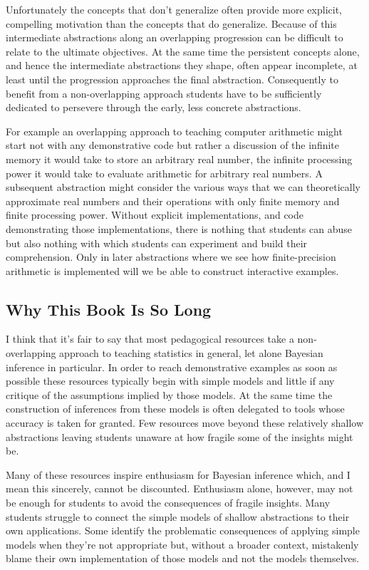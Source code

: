 \documentclass[
  letterpaper,
  DIV=11,
  numbers=noendperiod]{scrartcl}
\begin{document}
Unfortunately the concepts that don't generalize often provide more
explicit, compelling motivation than the concepts that do generalize.
Because of this intermediate abstractions along an overlapping
progression can be difficult to relate to the ultimate objectives. At
the same time the persistent concepts alone, and hence the intermediate
abstractions they shape, often appear incomplete, at least until the
progression approaches the final abstraction. Consequently to benefit
from a non-overlapping approach students have to be sufficiently
dedicated to persevere through the early, less concrete abstractions.

For example an overlapping approach to teaching computer arithmetic
might start not with any demonstrative code but rather a discussion of
the infinite memory it would take to store an arbitrary real number, the
infinite processing power it would take to evaluate arithmetic for
arbitrary real numbers. A subsequent abstraction might consider the
various ways that we can theoretically approximate real numbers and
their operations with only finite memory and finite processing power.
Without explicit implementations, and code demonstrating those
implementations, there is nothing that students can abuse but also
nothing with which students can experiment and build their
comprehension. Only in later abstractions where we see how
finite-precision arithmetic is implemented will we be able to construct
interactive examples.

\hypertarget{why-this-book-is-so-long}{%
\subsection{Why This Book Is So Long}\label{why-this-book-is-so-long}}

I think that it's fair to say that most pedagogical resources take a
non-overlapping approach to teaching statistics in general, let alone
Bayesian inference in particular. In order to reach demonstrative
examples as soon as possible these resources typically begin with simple
models and little if any critique of the assumptions implied by those
models. At the same time the construction of inferences from these
models is often delegated to tools whose accuracy is taken for granted.
Few resources move beyond these relatively shallow abstractions leaving
students unaware at how fragile some of the insights might be.

Many of these resources inspire enthusiasm for Bayesian inference which,
and I mean this sincerely, cannot be discounted. Enthusiasm alone,
however, may not be enough for students to avoid the consequences of
fragile insights. Many students struggle to connect the simple models of
shallow abstractions to their own applications. Some identify the
problematic consequences of applying simple models when they're not
appropriate but, without a broader context, mistakenly blame their own
implementation of those models and not the models themselves.
\end{document}
